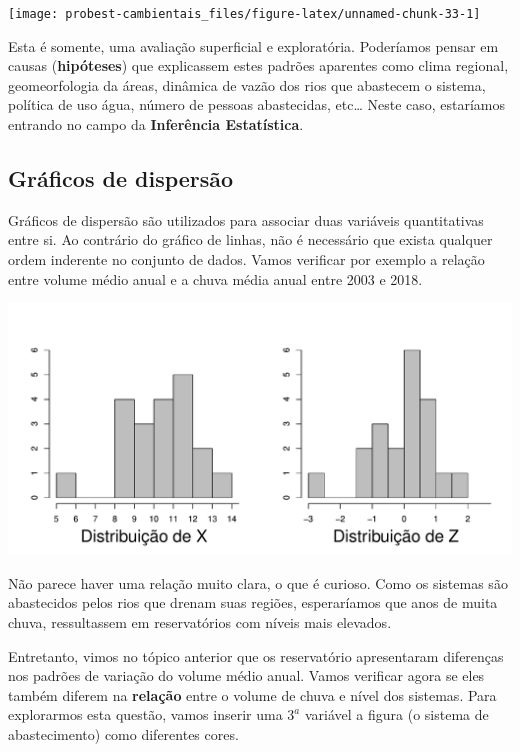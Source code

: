 \documentclass[
]{book}
\begin{document}
\begin{center}\texttt{[image: probest-cambientais\_files/figure-latex/unnamed-chunk-33-1]} \end{center}

Esta é somente, uma avaliação superficial e exploratória. Poderíamos pensar em causas (\textbf{hipóteses}) que explicassem estes padrões aparentes como clima regional, geomeorfologia da áreas, dinâmica de vazão dos rios que abastecem o sistema, política de uso água, número de pessoas abastecidas, etc\ldots{} Neste caso, estaríamos entrando no campo da \textbf{Inferência Estatística}.

\hypertarget{gruxe1ficos-de-dispersuxe3o}{%
\subsection{Gráficos de dispersão}\label{gruxe1ficos-de-dispersuxe3o}}

Gráficos de dispersão são utilizados para associar duas variáveis quantitativas entre si. Ao contrário do gráfico de linhas, não é necessário que exista qualquer ordem inderente no conjunto de dados. Vamos verificar por exemplo a relação entre volume médio anual e a chuva média anual entre 2003 e 2018.

\begin{center}\includegraphics{probest-cambientais_files/figure-latex/unnamed-chunk-34-1} \end{center}

Não parece haver uma relação muito clara, o que é curioso. Como os sistemas são abastecidos pelos rios que drenam suas regiões, esperaríamos que anos de muita chuva, ressultassem em reservatórios com níveis mais elevados.

Entretanto, vimos no tópico anterior que os reservatório apresentaram diferenças nos padrões de variação do volume médio anual. Vamos verificar agora se eles também diferem na \textbf{relação} entre o volume de chuva e nível dos sistemas. Para explorarmos esta questão, vamos inserir uma \(3^a\) variável a figura (o sistema de abastecimento) como diferentes cores.
\end{document}
